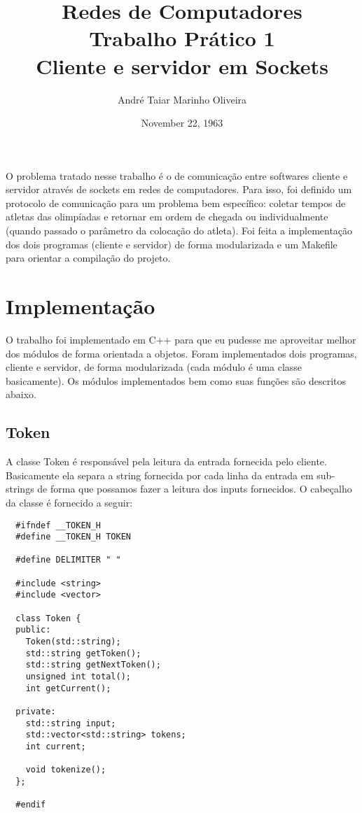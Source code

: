 \documentclass[12pt]{article}
\title{Redes de Computadores \\ Trabalho Prático 1 \\
\huge{Cliente e servidor em Sockets}}
\date{November 22, 1963}
\author{André Taiar Marinho Oliveira}
\begin{document}
\maketitle

\begin{resumo}
O problema tratado nesse trabalho é o de comunicação entre softwares cliente e
servidor através de sockets em redes de computadores. Para isso, foi definido um
protocolo de comunicação para um problema bem específico: coletar tempos de
atletas das olimpíadas e retornar em ordem de chegada ou individualmente (quando
passado o parâmetro da colocação do atleta). Foi feita a implementação dos dois
programas (cliente e servidor) de forma modularizada e um Makefile para orientar
a compilação do projeto.
\end{resumo}

\section{Implementação}
O trabalho foi implementado em C++ para que eu pudesse me aproveitar melhor dos
módulos de forma orientada a objetos. Foram implementados dois programas,
cliente e servidor, de forma modularizada (cada módulo é uma classe
basicamente). Os módulos implementados bem como suas funções são descritos
abaixo.

\subsection{Token}
A classe Token é responsável pela leitura da entrada fornecida pelo cliente.
Basicamente ela separa a string fornecida por cada linha da entrada em
sub-strings de forma que possamos fazer a leitura dos inputs fornecidos. O
cabeçalho da classe é fornecido a seguir:

\begin{verbatim}
  #ifndef __TOKEN_H
  #define __TOKEN_H TOKEN

  #define DELIMITER " "

  #include <string>
  #include <vector>

  class Token {
  public:
    Token(std::string);
    std::string getToken();
    std::string getNextToken();
    unsigned int total();
    int getCurrent();

  private:
    std::string input;
    std::vector<std::string> tokens;
    int current;

    void tokenize();
  };

  #endif
\end{verbatim}
\end{document}

